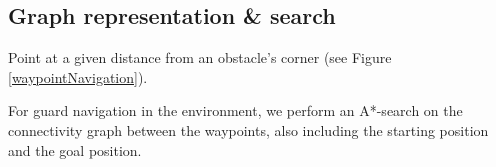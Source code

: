 \subsection{Graph representation \& search}
\begin{definition}[Waypoint]
Point at a given distance from an obstacle's corner (see Figure \ref{waypointNavigation}).
\end{definition}
For guard navigation in the environment, we perform an A*-search on the connectivity graph between the waypoints, also including the starting position and the goal position.

